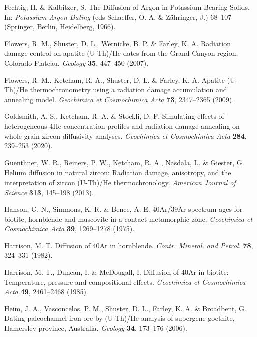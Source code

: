 \documentclass[gchron, manuscript]{copernicus}
\begin{document}
\begin{thebibliography}{}
Fechtig, H. \& Kalbitzer, S. The Diffusion of Argon in Potassium-Bearing Solids. In: \emph{Potassium Argon Dating} (eds Schaeffer, O. A. \& Z\"ahringer, J.) 68--107 (Springer, Berlin, Heidelberg, 1966).

Flowers, R. M., Shuster, D. L., Wernicke, B. P. \& Farley, K. A. Radiation damage control on apatite (U-Th)/He dates from the Grand Canyon region, Colorado Plateau. \emph{Geology} \textbf{35}, 447--450 (2007).

Flowers, R. M., Ketcham, R. A., Shuster, D. L. \& Farley, K. A. Apatite (U-Th)/He thermochronometry using a radiation damage accumulation and annealing model. \emph{Geochimica et Cosmochimica Acta} \textbf{73}, 2347--2365 (2009).

Goldsmith, A. S., Ketcham, R. A. \& Stockli, D. F. Simulating effects of heterogeneous 4He concentration profiles and radiation damage annealing on whole-grain zircon diffusivity analyses. \emph{Geochimica et Cosmochimica Acta} \textbf{284}, 239--253 (2020).

Guenthner, W. R., Reiners, P. W., Ketcham, R. A., Nasdala, L. \& Giester, G. Helium diffusion in natural zircon: Radiation damage, anisotropy, and the interpretation of zircon (U-Th)/He thermochronology. \emph{American Journal of Science} \textbf{313}, 145--198 (2013).

Hanson, G. N., Simmons, K. R. \& Bence, A. E. 40Ar/39Ar spectrum ages for biotite, hornblende and muscovite in a contact metamorphic zone. \emph{Geochimica et Cosmochimica Acta} \textbf{39}, 1269--1278 (1975).

Harrison, M. T. Diffusion of 40Ar in hornblende. \emph{Contr. Mineral. and Petrol.} \textbf{78}, 324--331 (1982).

Harrison, M. T., Duncan, I. \& McDougall, I. Diffusion of 40Ar in biotite: Temperature, pressure and compositional effects. \emph{Geochimica et Cosmochimica Acta} \textbf{49}, 2461--2468 (1985).

Heim, J. A., Vasconcelos, P. M., Shuster, D. L., Farley, K. A. \& Broadbent, G. Dating paleochannel iron ore by (U-Th)/He analysis of supergene goethite, Hamersley province, Australia. \emph{Geology} \textbf{34}, 173--176 (2006).


\end{thebibliography}
\end{document}
